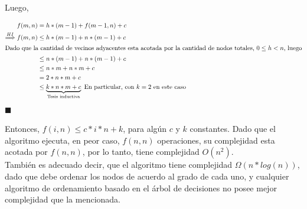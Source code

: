 Luego,

\begin{align*}
f(m,n) & = h*(m-1) + f(m-1,n) + c \\
 \stackrel{HI}{\Longrightarrow} f(m,n) & \leq h*(m-1) + n*(m-1) + c \\
 \intertext{Dado que la cantidad de vecinos adyacentes esta acotada por la cantidad de nodos totales, $0 \leq h < n$, luego}
 & \leq n*(m-1)+n*(m-1) + c\\
 & \leq n*m + n*m + c\\
 & = 2*n*m + c\\
 & \leq \underbrace{k*n*m + c}_{\text{Tesis inductiva}} \text{       En particular, con $k = 2$ en este caso}
\end{align*}
\hfill $\blacksquare$

Entonces, $f(i,n) \leq c*i*n + k$, para algún $c$ y $k$ constantes.
Dado que el algoritmo ejecuta, en peor caso, $f(n,n)$ operaciones, su complejidad esta acotada por $f(n,n)$, por lo tanto, tiene complejidad $O(n^{2})$.\\

También es adecuado decir, que el algoritmo tiene complejidad $\Omega(n*log(n))$, dado que debe ordenar los nodos de acuerdo al grado de cada uno, y cualquier algoritmo de ordenamiento basado en el árbol de decisiones no posee mejor complejidad que la mencionada.

